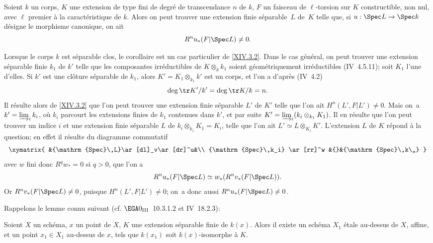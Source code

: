 \begin{corollaire} \label{XIV.3.3}
Soient $k$ un corps, $K$ une extension de type fini de degr\'e de transcendance $n$ de $k$, $F$ un faisceau de $\ell$-torsion sur $K$ constructible, non nul, avec $\ell$ premier \`a la caract\'eristique de $k$. Alors on peut trouver une extension finie s\'eparable~$L$ de~$K$ telle que, si $u: \Spec L \to \Spec k$ d\'esigne le morphisme canonique, on ait
$$R^n u_*(F{|\Spec L}) \neq 0.
$$
\end{corollaire}

Lorsque le corps $k$ est s\'eparable clos, le corollaire est un cas particulier de \ref{XIV.3.2}. Dans le cas g\'en\'eral, on peut trouver une extension s\'eparable finie $k_1$ de $k'$ telle que les composantes irr\'eductibles de $K \otimes_k k_1$ soient g\'eom\'etriquement irr\'eductibles (\EGA IV~4.5.11); soit $K_1$ l'une d'elles. Si $k'$ est une cl\^{o}ture s\'eparable de $k_1$, alors $K' = K_1 \otimes_{k_1} k'$ est un corps, et l'on a d'apr\`es (\EGA IV~4.2)
$$
\deg \tr K'/k' = \deg \tr K/k = n.
$$
Il r\'esulte alors de \ref{XIV.3.2} que l'on peut trouver une extension finie s\'eparable $L'$ de $K'$ telle que l'on ait $H^n(L', F{|L'}) \neq 0$. Mais on~a $k' = \varinjlim_i k_i$, o\`u $k_i$ parcourt les extensions finies de $k_1$ contenues dans $k'$, et par suite $K' = \varinjlim_i (k_i \otimes_{k_1} K_1)$. Il en r\'esulte que l'on peut trouver un indice $i$ et une extension finie s\'eparable $L$ de $k_i \otimes_{k_1} K_1 =K_i$, telle que l'on ait $L' \simeq L \otimes_{K_i} K'$. L'extension $L$ de $K$ r\'epond \`a la question; en effet il r\'esulte du diagramme commutatif
$$
\xymatrix{
&{\mathrm{Spec}\,L}\ar[dl]_v\ar[dr]^u&\\
{\mathrm{Spec}\,k_i} \ar[rr]^w &{}&{\mathrm{Spec}\,k\,,}
}
$$
avec $w$ fini donc $R^q w_* = 0$ si $q>0$, que l'on a
$$R^n u_*(F{|\Spec L}) \simeq w_*(R^n v_*(F{|\Spec L})).
$$
Or $R^nv_*(F{|\Spec L}) \neq 0$, puisque $H^n(L', F{|L'}) \neq 0$; on~a donc aussi $R^nu_*(F{|\Spec L}) \neq 0$.

Rappelons le lemme connu suivant (cf. $\EGA 0_{\textup{III}}$~10.3.1.2 et \EGA IV~18.2.3):

\begin{lemme} \label{XIV.3.4}
Soient $X$ un sch\'ema, $x$ un point de $X$, $K$ une extension s\'eparable finie de $k(x)$. Alors il existe un sch\'ema $X_1$ \'etale au-dessus de $X$, affine, et un point $x_1 \in X_1$ au-dessus de $x$, tels que $k(x_1)$ soit $k(x)$-isomorphe \`a $K$.
\end{lemme}

